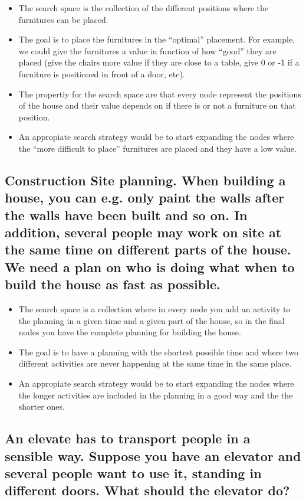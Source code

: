 \documentclass[paper=a4, fontsize=11pt]{scrartcl} %
\numberwithin{equation}{section} %
\numberwithin{figure}{section} %
\numberwithin{table}{section} %
\begin{document}
\begin{itemize}
	\item The search space is the collection of the different positions where the furnitures can be placed. 
	\item The goal is to place the furnitures in the “optimal” placement. For example, we could give the furnitures a value in function of how “good” they are placed (give the chairs more value if they are close to a table, give 0 or -1 if a furniture is positioned in front of a door, etc). 
	\item The propertiy for the search space are that every node represent the positions of the house and their value depends on if there is or not a furniture on that position.
	\item An appropiate search strategy would be to start expanding the nodes where the “more difficult to place” furnitures are placed and they have a low value.
\end{itemize}


\subsection{Construction Site planning. When building a house, you can e.g. only paint the walls after the walls have been built and so on. In addition, several people may work on site at the same time on different parts of the house. We need a plan on who is doing what when to build the house as fast as possible.}

\begin{itemize}
	\item The search space is a collection where in every node you add an activity to the planning in a given time and a given part of the house, so in the final nodes you have the complete planning for building the house.
	\item The goal is to have a planning with the shortest possible time and where two different activities are never happening at the same time in the same place.
	\item An appropiate search strategy would be to start expanding the nodes where the longer activities are included in the planning in a good way and the the shorter ones.
\end{itemize}


\subsection{An elevate has to transport people in a sensible way. Suppose you have an elevator and several people want to use it, standing in different doors. What should the elevator do?}
\end{document}
